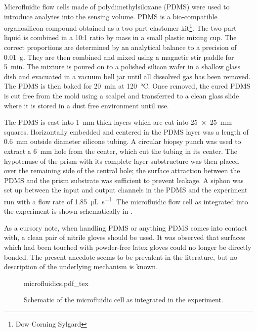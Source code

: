 Microfluidic flow cells made of polydimethylsiloxane (PDMS) were used to
introduce analytes into the sensing volume.  PDMS is a bio-compatible
organosilicon compound obtained as a two part elastomer kit\footnote{Dow
Corning Sylgard}.  The two part liquid is combined in a
10:1 ratio by mass in a small plastic mixing cup.  The correct proportions
are determined by an analytical balance to a precision of \SI{0.01}{\gram}.
They are then combined and mixed using a magnetic stir paddle for
\SI{5}{\minute}.  The mixture is poured on to a polished silicon wafer in a
shallow glass dish and evacuated in a vacuum bell jar until all dissolved
gas has been removed.  The PDMS is then baked for \SI{20}{\minute} at
\SI{120}{\celsius}.  Once removed, the cured PDMS is cut free from the mold
using a scalpel and transferred to a clean glass slide where it is stored
in a dust free environment until use.

The PDMS is cast into \SI{1}{\milli\meter} thick layers which are cut into
\SI{25x25}{\milli\meter} squares.  Horizontally embedded and centered in the
PDMS layer was a length of \SI{0.6}{\milli\meter} outside diameter
silicone tubing.  A circular biopsy punch was used to extract a
\SI{6}{\milli\meter} hole from the center, which cut the tubing in its center.
The hypotenuse of the prism with its complete layer substructure was then
placed over the remaining side of the central hole; the surface attraction
between the PDMS and the prism substrate was sufficient to prevent leakage.  A
siphon was set up between the input and output channels in the PDMS and the
experiment run with a flow rate of \SI{1.85}{\micro\liter\per\second}.  The
microfluidic flow cell as integrated into the experiment is shown schematically
in .

As a cursory note, when handling PDMS or anything PDMS comes into contact
with, a clean pair of nitrile gloves should be used.  It was observed that
surfaces which had been touched with powder-free latex gloves could no
longer be directly bonded.  The present anecdote seems to be prevalent in
the literature, but no description of the underlying mechanism is known.

\begin{figure}[ht]
\centering
{microfluidics.pdf_tex}
\caption{Schematic of the microfluidic cell as integrated in the experiment.}
\label{fig:microfluidiccell}
\end{figure}
